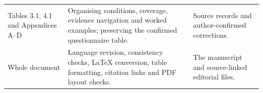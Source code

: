 \begin{longtable}{@{}>{\raggedright\arraybackslash}p{36.285mm}>{\raggedright\arraybackslash}p{62.763mm}>{\raggedright\arraybackslash}p{57.860mm}@{}}
\addlinespace[3pt]
Tables 3.1, 4.1 and Appendices A--D & Organising conditions, coverage, evidence navigation and worked examples; preserving the confirmed questionnaire table. & Source records and author-confirmed corrections. \\
\addlinespace[3pt]
Whole document & Language revision, consistency checks, LaTeX conversion, table formatting, citation links and PDF layout checks. & The manuscript and source-linked editorial files. \\
\end{longtable}
\endgroup

